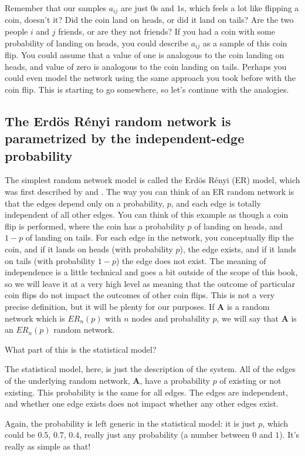 Remember that our samples $a_{ij}$ are just $0$s and $1$s, which {feels} a lot like flipping a coin, doesn't it? Did the coin land on heads, or did it land on tails? Are the two people $i$ and $j$ friends, or are they not friends? If you had a coin with some probability of landing on heads, you could describe $a_{ij}$ as a sample of this coin flip. You could assume that a value of one is analogous to the coin landing on heads, and value of zero is analogous to the coin landing on tails. Perhaps you could even model the network using the same approach you took before with the coin flip. This is starting to go somewhere, so let's continue with the analogies.


\subsection{The Erd\"os R\'enyi random network is parametrized by the independent-edge probability}

The simplest random network model is called the Erd\"os R\'enyi (ER) model, which was first described by \cite{erdos59a} and \cite{Gilbert1959Dec}. The way you can think of an ER random network is that the edges depend {only} on a probability, $p$, and each edge is totally independent of all other edges. You can think of this example as though a coin flip is performed, where the coin has a probability $p$ of landing on heads, and $1-p$ of landing on tails. For each edge in the network, you conceptually flip the coin, and if it lands on heads (with probability $p$), the edge exists, and if it lands on tails (with probability $1-p$) the edge does not exist. The meaning of {independence} is a little technical and goes a bit outside of the scope of this book, so we will leave it at a very high level as meaning that the outcome of particular coin flips do not impact the outcomes of other coin flips. This is not a very precise definition, but it will be plenty for our purposes. If $\mathbf A$ is a random network which is $ER_n(p)$ with $n$ nodes and probability $p$, we will say that $\mathbf A$ is an $ER_n(p)$ random network.

\begin{floatingbox}[h]\caption{What part of this is the statistical model?}
The statistical model, here, is just the description of the system. {All} of the edges of the underlying random network, $\mathbf A$, have a probability $p$ of existing or not existing. This probability is the same for all edges. The edges are independent, and whether one edge exists does not impact whether any other edges exist. 

Again, the probability is left generic in the statistical model: it is just $p$, which could be $0.5$, $0.7$, $0.4$, really just any probability (a number between $0$ and $1$). It's really as simple as that!
\end{floatingbox}


